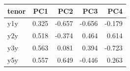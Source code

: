 
\begin{tabular}{lrrrr}
\toprule
tenor & PC1 & PC2 & PC3 & PC4\\
\midrule
y1y & 0.325 & -0.657 & -0.656 & -0.179\\
y2y & 0.518 & -0.374 & 0.464 & 0.614\\
y3y & 0.563 & 0.081 & 0.394 & -0.723\\
y5y & 0.557 & 0.649 & -0.446 & 0.263\\
\bottomrule
\end{tabular}
